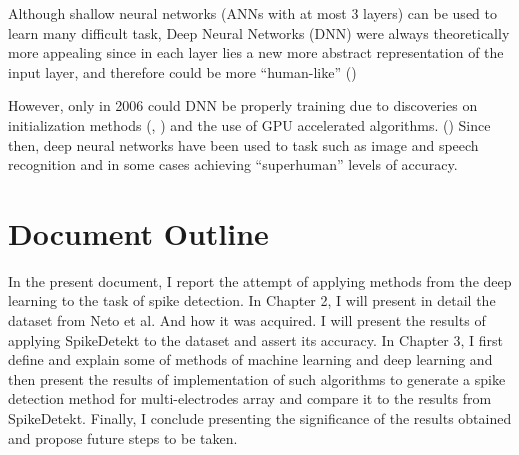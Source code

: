 Although shallow neural networks (ANNs with at most 3 layers) can be used to learn many difficult task, Deep Neural Networks (DNN) were always theoretically more appealing since in each layer lies a new more abstract representation of the input layer, and therefore could be more “human-like” (\cite{rumelhart1988learning})

However, only in 2006 could DNN be properly training due to discoveries on initialization methods (\cite{hinton2006fast}, \cite{bengio2007greedy}) and the use of GPU accelerated algorithms. (\cite{raina2009large})
Since then, deep neural networks have been used to task such as image and speech recognition and in some cases achieving “superhuman” levels of accuracy.

\section{Document Outline}
In the present document, I report the attempt of applying methods from the deep learning to the task of spike detection. In Chapter 2, I will present in detail the dataset from Neto et al. And how it was acquired. I will present the results of applying SpikeDetekt to the dataset and assert its accuracy. In Chapter 3, I first define and explain some of methods of machine learning and deep learning and then present the results of implementation of such algorithms to generate a spike detection method for multi-electrodes array and compare it to the results from SpikeDetekt. Finally, I conclude presenting the significance of the results obtained and propose future steps to be taken.

